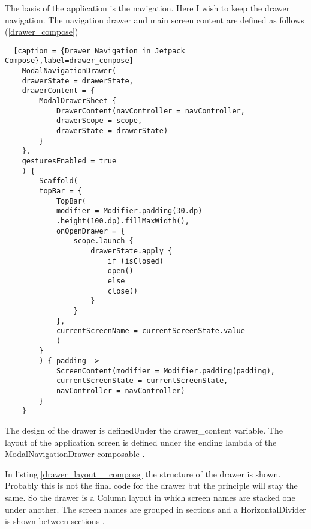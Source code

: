 The basis of the application is the navigation. Here I wish to keep the drawer navigation. 
The navigation drawer and main screen content are defined as follows (\ref{drawer_compose})

\begin{lstlisting}  [caption = {Drawer Navigation in Jetpack Compose},label=drawer_compose]
	ModalNavigationDrawer(
	drawerState = drawerState,
	drawerContent = {
		ModalDrawerSheet {
			DrawerContent(navController = navController,
			drawerScope = scope,
			drawerState = drawerState)
		}
	},
	gesturesEnabled = true
	) {
		Scaffold(
		topBar = {
			TopBar(
			modifier = Modifier.padding(30.dp)
			.height(100.dp).fillMaxWidth(),
			onOpenDrawer = {
				scope.launch {
					drawerState.apply {
						if (isClosed)
						open()
						else
						close()
					}
				}
			},
			currentScreenName = currentScreenState.value
			)
		}
		) { padding ->
			ScreenContent(modifier = Modifier.padding(padding),
			currentScreenState = currentScreenState,
			navController = navController)
		}
	}
\end{lstlisting}

The design of the drawer is definedUnder the drawer\_content variable. The layout of the application screen is defined under the ending lambda of the ModalNavigationDrawer composable . 

In listing \ref{drawer_layout__compose} the structure of the drawer is shown. Probably this is not the final code for the drawer but the principle will stay the same. So the drawer is a Column layout in which screen names are stacked one under another. The screen names are grouped in sections and a HorizontalDivider is shown between sections .

